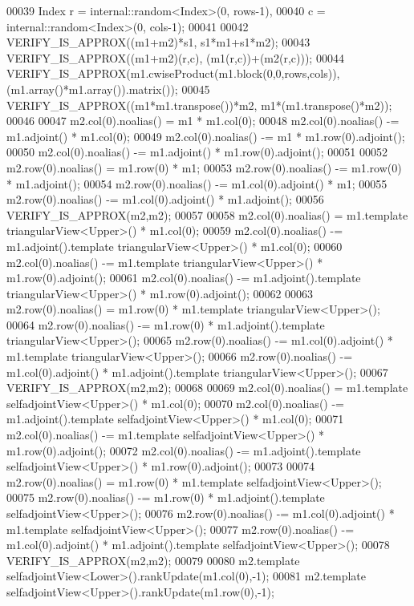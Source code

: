 \begin{DoxyCode}
00039   Index r = internal::random<Index>(0, rows-1),
00040         c = internal::random<Index>(0, cols-1);
00041 
00042   VERIFY\_IS\_APPROX((m1+m2)*s1,              s1*m1+s1*m2);
00043   VERIFY\_IS\_APPROX((m1+m2)(r,c), (m1(r,c))+(m2(r,c)));
00044   VERIFY\_IS\_APPROX(m1.cwiseProduct(m1.block(0,0,rows,cols)), (m1.array()*m1.array()).matrix());
00045   VERIFY\_IS\_APPROX((m1*m1.transpose())*m2,  m1*(m1.transpose()*m2));
00046   
00047   m2.col(0).noalias() = m1 * m1.col(0);
00048   m2.col(0).noalias() -= m1.adjoint() * m1.col(0);
00049   m2.col(0).noalias() -= m1 * m1.row(0).adjoint();
00050   m2.col(0).noalias() -= m1.adjoint() * m1.row(0).adjoint();
00051 
00052   m2.row(0).noalias() = m1.row(0) * m1;
00053   m2.row(0).noalias() -= m1.row(0) * m1.adjoint();
00054   m2.row(0).noalias() -= m1.col(0).adjoint() * m1;
00055   m2.row(0).noalias() -= m1.col(0).adjoint() * m1.adjoint();
00056   VERIFY\_IS\_APPROX(m2,m2);
00057   
00058   m2.col(0).noalias() = m1.template triangularView<Upper>() * m1.col(0);
00059   m2.col(0).noalias() -= m1.adjoint().template triangularView<Upper>() * m1.col(0);
00060   m2.col(0).noalias() -= m1.template triangularView<Upper>() * m1.row(0).adjoint();
00061   m2.col(0).noalias() -= m1.adjoint().template triangularView<Upper>() * m1.row(0).adjoint();
00062 
00063   m2.row(0).noalias() = m1.row(0) * m1.template triangularView<Upper>();
00064   m2.row(0).noalias() -= m1.row(0) * m1.adjoint().template triangularView<Upper>();
00065   m2.row(0).noalias() -= m1.col(0).adjoint() * m1.template triangularView<Upper>();
00066   m2.row(0).noalias() -= m1.col(0).adjoint() * m1.adjoint().template triangularView<Upper>();
00067   VERIFY\_IS\_APPROX(m2,m2);
00068   
00069   m2.col(0).noalias() = m1.template selfadjointView<Upper>() * m1.col(0);
00070   m2.col(0).noalias() -= m1.adjoint().template selfadjointView<Upper>() * m1.col(0);
00071   m2.col(0).noalias() -= m1.template selfadjointView<Upper>() * m1.row(0).adjoint();
00072   m2.col(0).noalias() -= m1.adjoint().template selfadjointView<Upper>() * m1.row(0).adjoint();
00073 
00074   m2.row(0).noalias() = m1.row(0) * m1.template selfadjointView<Upper>();
00075   m2.row(0).noalias() -= m1.row(0) * m1.adjoint().template selfadjointView<Upper>();
00076   m2.row(0).noalias() -= m1.col(0).adjoint() * m1.template selfadjointView<Upper>();
00077   m2.row(0).noalias() -= m1.col(0).adjoint() * m1.adjoint().template selfadjointView<Upper>();
00078   VERIFY\_IS\_APPROX(m2,m2);
00079   
00080   m2.template selfadjointView<Lower>().rankUpdate(m1.col(0),-1);
00081   m2.template selfadjointView<Upper>().rankUpdate(m1.row(0),-1);

\end{DoxyCode}

